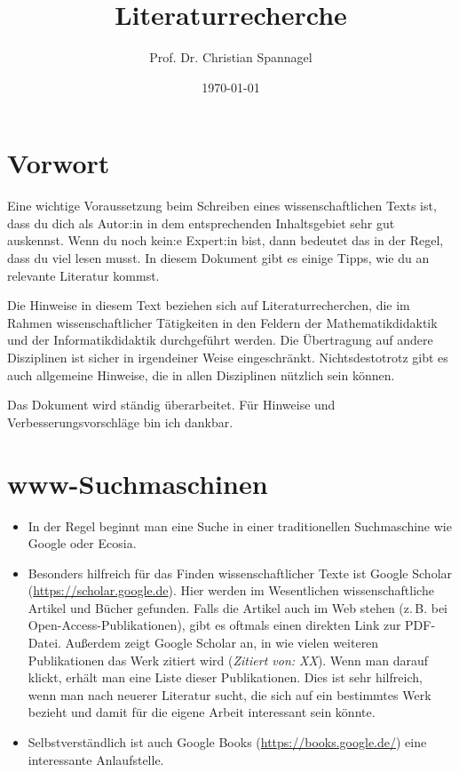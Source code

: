 \documentclass{../cssheet}
\title{Literaturrecherche}
\author{Prof. Dr. Christian Spannagel}
\date{\today}
\begin{document}
\printtitle
\printdate
\singlespacing


\section{Vorwort}

Eine wichtige Voraussetzung beim Schreiben eines wissenschaftlichen Texts ist, dass du dich als Autor:in in dem entsprechenden Inhaltsgebiet sehr gut auskennst. Wenn du noch kein:e Expert:in bist, dann bedeutet das in der Regel, dass du viel lesen musst. In diesem Dokument gibt es einige Tipps, wie du an relevante Literatur kommst.

Die Hinweise in diesem Text beziehen sich auf Literaturrecherchen, die im Rahmen wissenschaftlicher Tätigkeiten in den Feldern der Mathematikdidaktik und der Informatikdidaktik durchgeführt werden. Die Übertragung auf andere Disziplinen ist sicher in irgendeiner Weise eingeschränkt. Nichtsdestotrotz gibt es auch allgemeine Hinweise, die in allen Disziplinen nützlich sein können.

Das Dokument wird ständig überarbeitet. Für Hinweise und Verbesserungsvorschläge bin ich dankbar.

\section{www-Suchmaschinen}
\begin{itemize}
\item In der Regel beginnt man eine Suche in einer traditionellen Suchmaschine wie Google oder Ecosia.
\item Besonders hilfreich für das Finden wissenschaftlicher Texte ist Google Scholar (\url{https://scholar.google.de}). Hier werden im Wesentlichen wissenschaftliche Artikel und Bücher gefunden. Falls die Artikel auch im Web stehen (z.\,B. bei Open-Access-Publikationen), gibt es oftmals einen direkten Link zur PDF-Datei. Außerdem zeigt Google Scholar an, in wie vielen weiteren Publikationen das Werk zitiert wird (\emph{Zitiert von: XX}). Wenn man darauf klickt, erhält man eine Liste dieser Publikationen. Dies ist sehr hilfreich, wenn man nach neuerer Literatur sucht, die sich auf ein bestimmtes Werk bezieht und damit für die eigene Arbeit interessant sein könnte.
\item Selbstverständlich ist auch Google Books (\url{https://books.google.de/}) eine interessante Anlaufstelle.
\end{itemize}
\pagestyle{docstyle}
\end{document}
